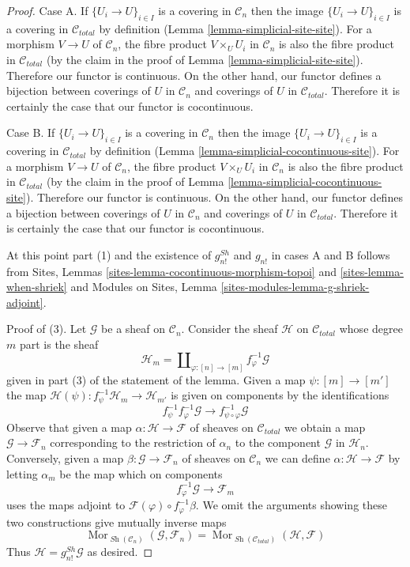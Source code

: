 \documentclass{stacks-project}
\theoremstyle{plain}
\theoremstyle{definition}
\theoremstyle{remark}
\numberwithin{equation}{subsection}
\def\Mor{\mathop{\mathrm{Mor}}\nolimits}
\def\Sh{\mathop{\mathit{Sh}}\nolimits}
\begin{document}
\begin{proof}
Case A. If $\{U_i \to U\}_{i \in I}$ is a covering in $\mathcal{C}_n$
then the image $\{U_i \to U\}_{i \in I}$ is a covering in $\mathcal{C}_{total}$
by definition (Lemma \ref{lemma-simplicial-site-site}). For a morphism
$V \to U$ of $\mathcal{C}_n$, the fibre product
$V \times_U U_i$ in $\mathcal{C}_n$ is also
the fibre product in $\mathcal{C}_{total}$ (by the claim in the
proof of Lemma \ref{lemma-simplicial-site-site}).
Therefore our functor is continuous. On the other hand, our functor
defines a bijection between coverings of $U$ in $\mathcal{C}_n$
and coverings of $U$ in $\mathcal{C}_{total}$. Therefore it is
certainly the case that our functor is cocontinuous.

\medskip\noindent
Case B. If $\{U_i \to U\}_{i \in I}$ is a covering in $\mathcal{C}_n$
then the image $\{U_i \to U\}_{i \in I}$ is a covering in $\mathcal{C}_{total}$
by definition (Lemma \ref{lemma-simplicial-cocontinuous-site}). For a morphism
$V \to U$ of $\mathcal{C}_n$, the fibre product
$V \times_U U_i$ in $\mathcal{C}_n$ is also
the fibre product in $\mathcal{C}_{total}$ (by the claim in the
proof of Lemma \ref{lemma-simplicial-cocontinuous-site}).
Therefore our functor is continuous. On the other hand, our functor
defines a bijection between coverings of $U$ in $\mathcal{C}_n$
and coverings of $U$ in $\mathcal{C}_{total}$. Therefore it is
certainly the case that our functor is cocontinuous.

\medskip\noindent
At this point part (1) and the existence of $g^{Sh}_{n!}$ and $g_{n!}$
in cases A and B follows from
Sites, Lemmas \ref{sites-lemma-cocontinuous-morphism-topoi} and
\ref{sites-lemma-when-shriek}
and
Modules on Sites, Lemma \ref{sites-modules-lemma-g-shriek-adjoint}.

\medskip\noindent
Proof of (3). Let $\mathcal{G}$ be a sheaf on $\mathcal{C}_n$.
Consider the sheaf $\mathcal{H}$ on $\mathcal{C}_{total}$
whose degree $m$ part is the sheaf
$$
\mathcal{H}_m = \coprod\nolimits_{\varphi : [n] \to [m]}
f_\varphi^{-1}\mathcal{G}
$$
given in part (3) of the statement of the lemma.
Given a map $\psi : [m] \to [m']$ the map
$\mathcal{H}(\psi) : f_\psi^{-1}\mathcal{H}_m \to \mathcal{H}_{m'}$
is given on components by the identifications
$$
f_\psi^{-1} f_\varphi^{-1} \mathcal{G} \to
f_{\psi \circ \varphi}^{-1}\mathcal{G}
$$
Observe that given a map $\alpha : \mathcal{H} \to \mathcal{F}$
of sheaves on $\mathcal{C}_{total}$ we obtain a map
$\mathcal{G} \to \mathcal{F}_n$
corresponding to the restriction of $\alpha_n$ to the component
$\mathcal{G}$ in $\mathcal{H}_n$. Conversely, given a map
$\beta : \mathcal{G} \to \mathcal{F}_n$ of sheaves on $\mathcal{C}_n$
we can define
$\alpha : \mathcal{H} \to \mathcal{F}$ by letting $\alpha_m$
be the map which on components
$$
f_\varphi^{-1}\mathcal{G} \to \mathcal{F}_m
$$
uses the maps adjoint to $\mathcal{F}(\varphi) \circ f_\varphi^{-1}\beta$.
We omit the arguments showing these two constructions give
mutually inverse maps
$$
\Mor_{\Sh(\mathcal{C}_n)}(\mathcal{G}, \mathcal{F}_n) =
\Mor_{\Sh(\mathcal{C}_{total})}(\mathcal{H}, \mathcal{F})
$$
Thus $\mathcal{H} = g^{Sh}_{n!}\mathcal{G}$ as desired.


\end{proof}
\end{document}
